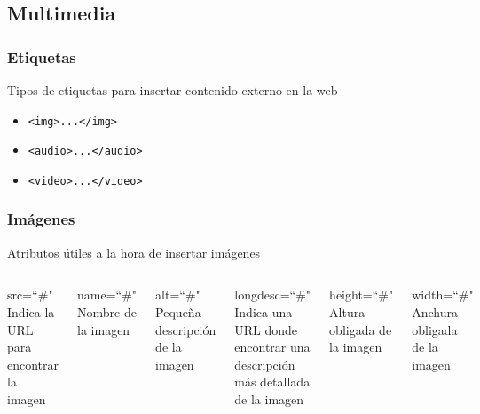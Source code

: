 \documentclass{beamer}
\begin{document}
	\subsection{Multimedia}
\begin{frame}[fragile]
\frametitle{Etiquetas}
	Tipos de etiquetas para insertar contenido externo en la web
	\begin{itemize}[<+->]
	\item \verb|<img>...</img>|
	\item \verb|<audio>...</audio>|
	\item \verb|<video>...</video>|
	\end{itemize}
\end{frame}

\begin{frame}[fragile]
\frametitle{Imágenes}
	Atributos útiles a la hora de insertar imágenes
	\begin{columns}[c]
	\begin{block}{src=``\#"}
	Indica la URL para encontrar la imagen
	\end{block}
	\pause
	\begin{block}{name=``\#"}
	Nombre de la imagen
	\end{block}
	\pause
	\begin{block}{alt=``\#"}
	Pequeña descripción de la imagen
	\end{block}
	\pause
	\begin{block}{longdesc=``\#"}
	Indica una URL donde encontrar una descripción más detallada de la imagen
	\end{block}
	\pause
	\begin{block}{height=``\#"}
	Altura obligada de la imagen
	\end{block}
	\pause
	\begin{block}{width=``\#"}
	Anchura obligada de la imagen
	\end{block}	
	\end{columns}
\end{frame}	
\end{document}
